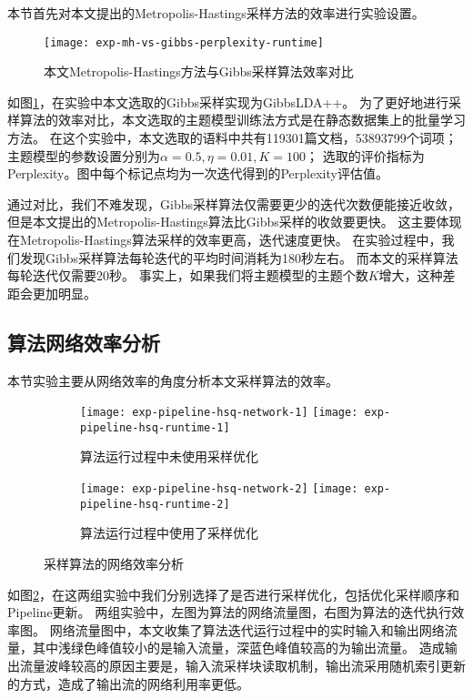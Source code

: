 本节首先对本文提出的Metropolis-Hastings采样方法的效率进行实验设置。
\begin{figure}[htb]\centering
\texttt{[image: exp-mh-vs-gibbs-perplexity-runtime]}
\caption{本文Metropolis-Hastings方法与Gibbs采样算法效率对比}
\label{fig:mh-vs-gibbs}       %
\end{figure}

如图\ref{fig:mh-vs-gibbs}，在实验中本文选取的Gibbs采样实现为GibbsLDA++\cite{gibbsLda++}。
为了更好地进行采样算法的效率对比，本文选取的主题模型训练法方式是在静态数据集上的批量学习方法。
在这个实验中，本文选取的语料中共有119301篇文档，53893799个词项；
主题模型的参数设置分别为$\alpha = 0.5, \eta = 0.01, K = 100$；
选取的评价指标为Perplexity。图中每个标记点均为一次迭代得到的Perplexity评估值。

通过对比，我们不难发现，Gibbs采样算法仅需要更少的迭代次数便能接近收敛，
但是本文提出的Metropolis-Hastings算法比Gibbs采样的收敛要更快。
这主要体现在Metropolis-Hastings算法采样的效率更高，迭代速度更快。
在实验过程中，我们发现Gibbs采样算法每轮迭代的平均时间消耗为180秒左右。
而本文的采样算法每轮迭代仅需要20秒。
事实上，如果我们将主题模型的主题个数$K$增大，这种差距会更加明显。

\subsection{算法网络效率分析}

本节实验主要从网络效率的角度分析本文采样算法的效率。
\begin{figure}[htb]\centering
\begin{subfigure}{1\textwidth}
\texttt{[image: exp-pipeline-hsq-network-1]}
\texttt{[image: exp-pipeline-hsq-runtime-1]}
\caption{算法运行过程中未使用采样优化}
\end{subfigure}
\begin{subfigure}{1\textwidth}
\texttt{[image: exp-pipeline-hsq-network-2]}
\texttt{[image: exp-pipeline-hsq-runtime-2]}
\caption{算法运行过程中使用了采样优化}
\end{subfigure}
\caption{采样算法的网络效率分析}
\label{fig:exp-pipeline}       %
\end{figure}

如图\ref{fig:exp-pipeline}，在这两组实验中我们分别选择了是否进行采样优化，包括优化采样顺序和Pipeline更新。
两组实验中，左图为算法的网络流量图，右图为算法的迭代执行效率图。
网络流量图中，本文收集了算法迭代运行过程中的实时输入和输出网络流量，其中浅绿色峰值较小的是输入流量，深蓝色峰值较高的为输出流量。
造成输出流量波峰较高的原因主要是，输入流采样块读取机制，输出流采用随机索引更新的方式，造成了输出流的网络利用率更低。


